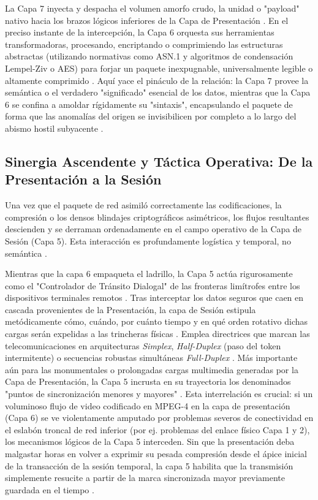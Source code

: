 \documentclass[a4paper,12pt]{article}
\begin{document}
La Capa 7 inyecta y despacha el volumen amorfo crudo, la unidad o "payload" nativo hacia los brazos lógicos inferiores de la Capa de Presentación \cite{fortinet_osi}. En el preciso instante de la intercepción, la Capa 6 orquesta sus herramientas transformadoras, procesando, encriptando o comprimiendo las estructuras abstractas (utilizando normativas como ASN.1 y algoritmos de condensación Lempel-Ziv o AES) para forjar un paquete inexpugnable, universalmente legible o altamente comprimido \cite{ionos_pres}. Aquí yace el pináculo de la relación: la Capa 7 provee la semántica o el verdadero "significado" esencial de los datos, mientras que la Capa 6 se confina a amoldar rígidamente su "sintaxis", encapsulando el paquete de forma que las anomalías del origen se invisibilicen por completo a lo largo del abismo hostil subyacente \cite{ibm_osi_layer6, ionos_pres}.

\subsection*{Sinergia Ascendente y Táctica Operativa: De la Presentación a la Sesión}

Una vez que el paquete de red asimiló correctamente las codificaciones, la compresión o los densos blindajes criptográficos asimétricos, los flujos resultantes descienden y se derraman ordenadamente en el campo operativo de la Capa de Sesión (Capa 5). Esta interacción es profundamente logística y temporal, no semántica \cite{ionos_sesion}. 

Mientras que la capa 6 empaqueta el ladrillo, la Capa 5 actúa rigurosamente como el "Controlador de Tránsito Dialogal" de las fronteras limítrofes entre los dispositivos terminales remotos \cite{ionos_sesion}. Tras interceptar los datos seguros que caen en cascada provenientes de la Presentación, la capa de Sesión estipula metódicamente cómo, cuándo, por cuánto tiempo y en qué orden rotativo dichas cargas serán expelidas a las trincheras físicas \cite{ionos_sesion}. Emplea directrices que marcan las telecomunicaciones en arquitecturas \textit{Simplex}, \textit{Half-Duplex} (paso del token intermitente) o secuencias robustas simultáneas \textit{Full-Duplex} \cite{ionos_sesion}. Más importante aún para las monumentales o prolongadas cargas multimedia generadas por la Capa de Presentación, la Capa 5 incrusta en su trayectoria los denominados "puntos de sincronización menores y mayores" \cite{ionos_sesion}. Esta interrelación es crucial: si un voluminoso flujo de video codificado en MPEG-4 en la capa de presentación (Capa 6) se ve violentamente amputado por problemas severos de conectividad en el eslabón troncal de red inferior (por ej. problemas del enlace físico Capa 1 y 2), los mecanismos lógicos de la Capa 5 interceden. Sin que la presentación deba malgastar horas en volver a exprimir su pesada compresión desde el ápice inicial de la transacción de la sesión temporal, la capa 5 habilita que la transmisión simplemente resucite a partir de la marca sincronizada mayor previamente guardada en el tiempo \cite{ionos_sesion}.
\end{document}
